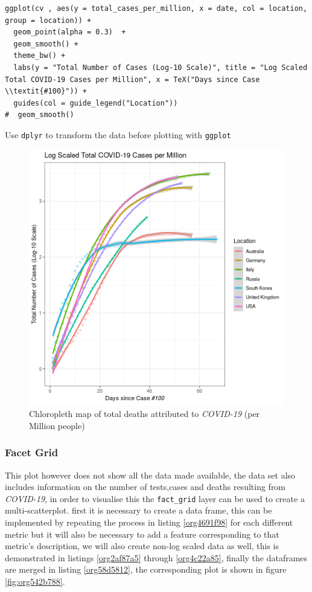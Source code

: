 \documentclass[11pt]{article}
\begin{document}
\begin{listing}[htbp]
\begin{verbatim}
ggplot(cv , aes(y = total_cases_per_million, x = date, col = location, group = location)) +
  geom_point(alpha = 0.3)  +
  geom_smooth() +
  theme_bw() +
  labs(y = "Total Number of Cases (Log-10 Scale)", title = "Log Scaled Total COVID-19 Cases per Million", x = TeX("Days since Case \\textit{#100}")) +
  guides(col = guide_legend("Location"))
#  geom_smooth()
\end{verbatim}
\caption{\label{org5bb4fe3}Use \texttt{dplyr} to transform the data before plotting with \texttt{ggplot}}
\end{listing}


\begin{figure}[htbp]
\centering
\includegraphics[width=12cm]{FirstTS.png}
\caption{\label{fig:org4bbeb34}Chloropleth map of total deaths attributed to \emph{COVID-19} (per Million people)}
\end{figure}

\subsubsection{Facet Grid}
\label{sec:org747b052}
This plot however does not show all the data made available, the data set also
includes information on the number of tests,cases and deaths resulting from
\emph{COVID-19}, in order to visualise this the \texttt{fact\_grid} layer can be used to
create a multi-scatterplot. first it is necessary to create a data frame, this
can be implemented by repeating the process in listing \ref{org4691f98} for each different
metric but it will also be necessary to add a feature corresponding to that
metric's description, we will also create non-log scaled data as well, this is
demonstrated in listings \ref{org2af87a5} through \ref{org4c22a85}, finally the dataframes are merged
in listing \ref{org58d5812}, the corresponding plot is shown in figure \ref{fig:org542b788}.
\end{document}
